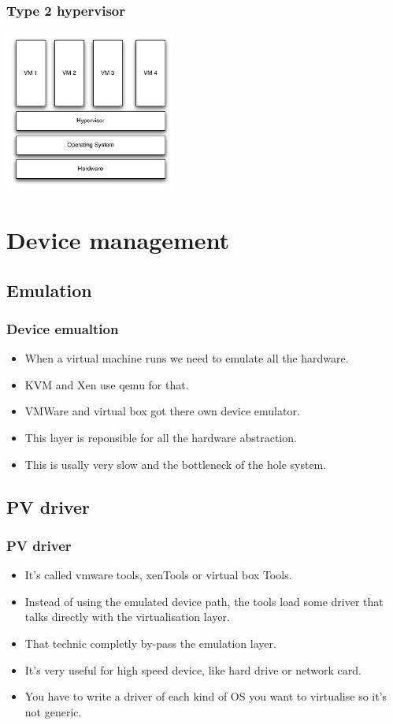 \begin{frame}
\frametitle{Type 2 hypervisor}
\begin{center}
\includegraphics[height=150pt]{pic/type_2}
\end{center}
\end{frame}

\section{Device management}
\subsection{Emulation}
\begin{frame}
\frametitle{Device emualtion}
\begin{itemize}
\item When a virtual machine runs we need to emulate all the hardware.
\item KVM and Xen use qemu for that.
\item VMWare and virtual box got there own device emulator.
\item This layer is reponsible for all the hardware abstraction.
\item This is usally very slow and the bottleneck of the hole system.
\end{itemize}
\end{frame}

\subsection{PV driver}
\begin{frame}
\frametitle{PV driver}
\begin{itemize}
\item It's called vmware tools, xenTools or virtual box Tools.
\item Instead of using the emulated device path, the tools load some
driver that talks directly with the virtualisation layer.
\item That technic completly by-pass the emulation layer.
\item It's very useful for high speed device, like hard drive or network
card.
\item You have to write a driver of each kind of OS you want to
virtualise so it's not generic.
\end{itemize}
\end{frame}

